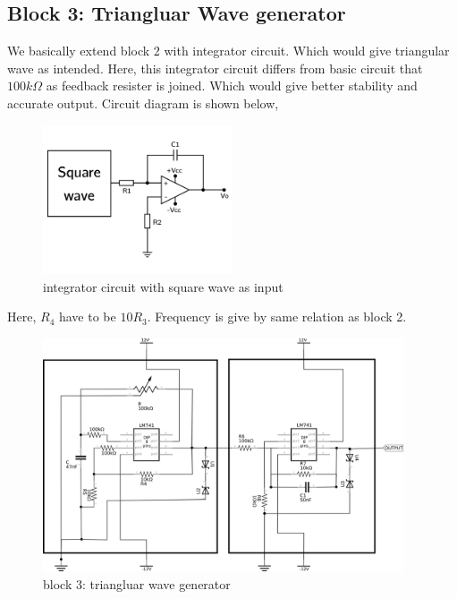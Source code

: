 \documentclass[12pt]{article}
\begin{document}
\subsection{Block 3: Triangluar Wave generator}
\label{sec:org9bc6e8a}

We basically extend block 2 with integrator circuit. Which would give triangular wave as intended. Here, this integrator circuit differs from basic circuit that \(100k\Omega\) as feedback resister is joined. Which would give better stability and accurate output. Circuit diagram is shown below,


\begin{figure}[H]
    \centering
    \label{triang}
    \includegraphics[width=0.5\textwidth]{imgs/triang.png}
    \caption{integrator circuit with square wave as input}
\end{figure}

Here, \(R_{4}\) have to be \(10R_{3}\). Frequency is give by same relation as block 2.


\begin{figure}[H]
    \centering
    \label{tringularreal}
    \includegraphics[width=0.95\textwidth]{imgs/triangreal.png}
    \caption{block 3: triangluar wave generator}
\end{figure}
\end{document}
